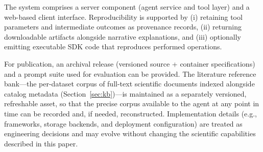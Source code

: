 The system comprises a server component (agent service and tool layer) and a web-based client interface.
Reproducibility is supported by (i) retaining tool parameters and intermediate outcomes as provenance records, (ii) returning downloadable artifacts alongside narrative explanations, and (iii) optionally emitting executable SDK code that reproduces performed operations.

For publication, an archival release (versioned source + container specifications) and a prompt suite used for evaluation can be provided.
The literature reference bank---the per-dataset corpus of full-text scientific documents indexed alongside catalog metadata (Section~\ref{sec:kb})---is maintained as a separately versioned, refreshable asset, so that the precise corpus available to the agent at any point in time can be recorded and, if needed, reconstructed.
Implementation details (e.g., frameworks, storage backends, and deployment configuration) are treated as engineering decisions and may evolve without changing the scientific capabilities described in this paper.
